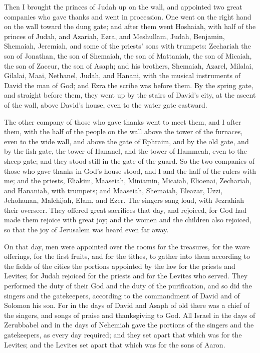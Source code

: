  Then I brought the princes of Judah up on the wall, and
appointed two great companies who gave thanks and went in procession.
One went on the right hand on the wall toward the dung gate;
 and after them went Hoshaiah, with half of the princes
of Judah,  and Azariah, Ezra, and Meshullam,
 Judah, Benjamin, Shemaiah, Jeremiah,  and
some of the priests' sons with trumpets: Zechariah the son of Jonathan,
the son of Shemaiah, the son of Mattaniah, the son of Micaiah, the son
of Zaccur, the son of Asaph;  and his brothers, Shemaiah,
Azarel, Milalai, Gilalai, Maai, Nethanel, Judah, and Hanani, with the
musical instruments of David the man of God; and Ezra the scribe was
before them.  By the spring gate, and straight before
them, they went up by the stairs of David's city, at the ascent of the
wall, above David's house, even to the water gate eastward.

 The other company of those who gave thanks went to meet
them, and I after them, with the half of the people on the wall above
the tower of the furnaces, even to the wide wall,  and
above the gate of Ephraim, and by the old gate, and by the fish gate,
the tower of Hananel, and the tower of Hammeah, even to the sheep gate;
and they stood still in the gate of the guard.  So the
two companies of those who gave thanks in God's house stood, and I and
the half of the rulers with me;  and the priests,
Eliakim, Maaseiah, Miniamin, Micaiah, Elioenai, Zechariah, and Hananiah,
with trumpets;  and Maaseiah, Shemaiah, Eleazar, Uzzi,
Jehohanan, Malchijah, Elam, and Ezer. The singers sang loud, with
Jezrahiah their overseer.  They offered great sacrifices
that day, and rejoiced, for God had made them rejoice with great joy;
and the women and the children also rejoiced, so that the joy of
Jerusalem was heard even far away.

 On that day, men were appointed over the rooms for the
treasures, for the wave offerings, for the first fruits, and for the
tithes, to gather into them according to the fields of the cities the
portions appointed by the law for the priests and Levites; for Judah
rejoiced for the priests and for the Levites who served. 
They performed the duty of their God and the duty of the purification,
and so did the singers and the gatekeepers, according to the commandment
of David and of Solomon his son.  For in the days of
David and Asaph of old there was a chief of the singers, and songs of
praise and thanksgiving to God.  All Israel in the days
of Zerubbabel and in the days of Nehemiah gave the portions of the
singers and the gatekeepers, as every day required; and they set apart
that which was for the Levites; and the Levites set apart that which was
for the sons of Aaron.

